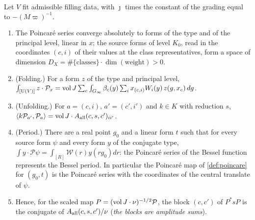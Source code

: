 \begin{theorem}\label{thm:unfolding}
Let $V$ fit admissible filling data, with $\jmath$ times the constant of the grading equal to $-(M\varpi)^{-1}$.
\begin{enumerate}[label=\textup{(\alph*)}]
\item The Poincar\'e series converge absolutely to forms of the type and of the principal level, linear in $x$; the source forms of level $K_0$, read in the coordinates $(c,i)$ of their values at
the class representatives, form a space of dimension $D_X=\#\{\text{classes}\}\cdot\dim(\text{weight})>0$.
\item (Folding.) For a form $z$ of the type and principal level, $\int_{[\operatorname{U}(V)]}z\cdot\mathcal P_x=\operatorname{vol} J\sum_c\int_{G_\infty}\beta_c(y)\sum_ix_{(c,i)}W_i(y)\,z(g,x_c)\,dg$.
\item (Unfolding.) For $a=(c,i)$, $a'=(c',i')$ and $k\in K$ with reduction $s$, $\langle k\mathcal P_{a'},\mathcal P_a\rangle=\operatorname{vol} J\cdot A_{\rm all}(c,s,c')_{ii'}$.
\item (Period.) There are a real point $g_0$ and a linear form $t$ such that for every source form $\psi$ and every form $y$ of the conjugate type, $\int y\cdot\mathcal P\psi=\int_{[R]}\mathcal W(r)y(rg_0)dr$:
the Poincar\'e series of the Bessel function represents the Bessel period. In particular the Poincar\'e map of \cref{def:poincare} for $(g_0,t)$ is the Poincar\'e series with the
coordinates of the central translate of $\psi$.
\item Hence, for the scaled map $P=(\operatorname{vol} J\cdot\nu)^{-1/2}\mathcal P$, the block $(c,c')$ of $P^*sP$ is the conjugate of $A_{\rm all}(c,s,c')/\nu$ (\emph{the blocks are amplitude sums}).
\end{enumerate}
\end{theorem}

